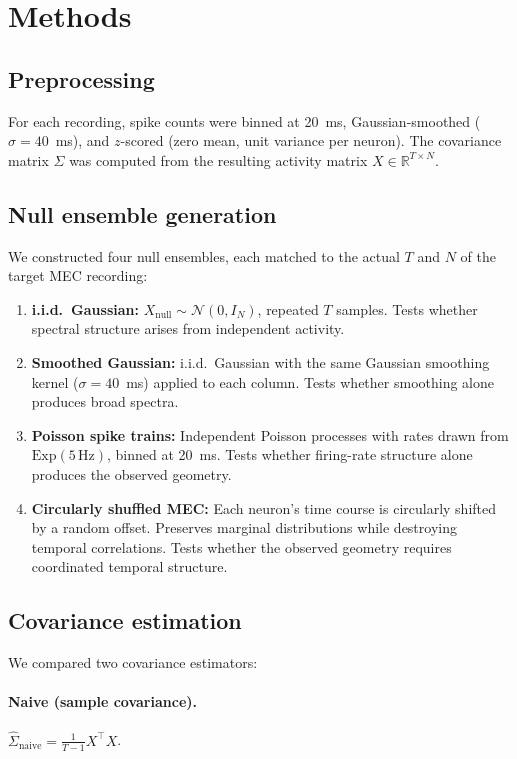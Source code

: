 \documentclass[aps,pre,reprint,twocolumn]{revtex4-2}
\begin{document}
\section{Methods}

\subsection{Preprocessing}

For each recording, spike counts were binned at 20~ms, Gaussian-smoothed ($\sigma = 40$~ms), and $z$-scored (zero mean, unit variance per neuron). The covariance matrix $\Sigma$ was computed from the resulting activity matrix $X \in \mathbb{R}^{T \times N}$.

\subsection{Null ensemble generation}

We constructed four null ensembles, each matched to the actual $T$ and $N$ of the target MEC recording:

\begin{enumerate}
\item \textbf{i.i.d.\ Gaussian:} $X_{\text{null}} \sim \mathcal{N}(0, I_{N})$, repeated $T$ samples. Tests whether spectral structure arises from independent activity.
\item \textbf{Smoothed Gaussian:} i.i.d.\ Gaussian with the same Gaussian smoothing kernel ($\sigma = 40$~ms) applied to each column. Tests whether smoothing alone produces broad spectra.
\item \textbf{Poisson spike trains:} Independent Poisson processes with rates drawn from $\text{Exp}(5\,\text{Hz})$, binned at 20~ms. Tests whether firing-rate structure alone produces the observed geometry.
\item \textbf{Circularly shuffled MEC:} Each neuron's time course is circularly shifted by a random offset. Preserves marginal distributions while destroying temporal correlations. Tests whether the observed geometry requires coordinated temporal structure.
\end{enumerate}

\subsection{Covariance estimation}

We compared two covariance estimators:

\paragraph{Naive (sample covariance).}
$\hat{\Sigma}_{\text{naive}} = \frac{1}{T-1} X^\top X$.
\end{document}
